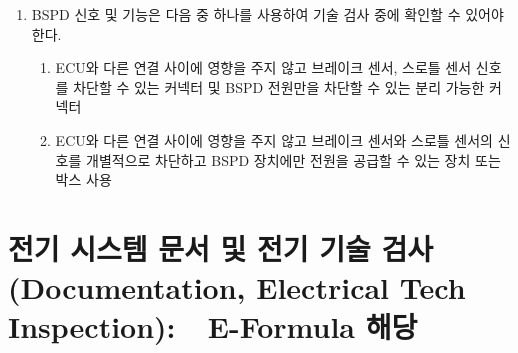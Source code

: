 \documentclass[final,a4paper,10pt]{report}
\begin{document}
\begin{enumerate}
\begin{enumerate}
      \item\label{rule:formula-technical.electronic-throttle-control.bspd.inspection-disconnect} BSPD 신호 및 기능은 다음 중 하나를 사용하여 기술 검사 중에 확인할 수 있어야 한다.
        \begin{enumerate}
          \item\label{rule:formula-technical.electronic-throttle-control.bspd.inspection-disconnect.dedicated-connectors} ECU와 다른 연결 사이에 영향을 주지 않고 브레이크 센서, 스로틀 센서 신호를 차단할 수 있는 커넥터 및 BSPD 전원만을 차단할 수 있는 분리 가능한 커넥터
          \item\label{rule:formula-technical.electronic-throttle-control.bspd.inspection-disconnect.switch-box} ECU와 다른 연결 사이에 영향을 주지 않고 브레이크 센서와 스로틀 센서의 신호를 개별적으로 차단하고 BSPD 장치에만 전원을 공급할 {\color{blue}수 있는} 장치 또는 박스 사용
        \end{enumerate}
    \end{enumerate}
\end{enumerate}

\chapter{전기 시스템 문서 및 전기 기술 검사 (Documentation, Electrical Tech Inspection):\ \ E-Formula 해당}
\end{document}
